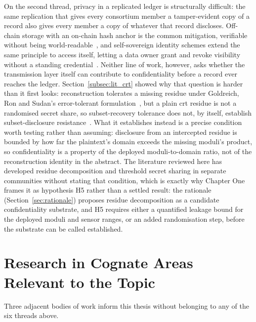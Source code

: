 \documentclass[12pt,a4paper,oneside]{book}
\begin{document}
On the second thread, privacy in a replicated ledger is structurally
difficult: the same replication that gives every consortium member a
tamper-evident copy of a record also gives every member a copy of whatever
that record discloses. Off-chain storage with an on-chain hash anchor is
the common mitigation, verifiable without being
world-readable~\cite{kim2023privacy}, and self-sovereign identity schemes
extend the same principle to access itself, letting a data owner grant and
revoke visibility without a standing
credential~\cite{amraouy2025ssi}. Neither line of work, however, asks
whether the transmission layer itself can contribute to confidentiality
before a record ever reaches the ledger. Section~\ref{subsec:lit_crt}
showed why that question is harder than it first looks: reconstruction
tolerates a missing residue under Goldreich, Ron and Sudan's
error-tolerant formulation~\cite{goldreich1999china}, but a plain
\gls{crt} residue is not a randomised secret share, so subset-recovery
tolerance does not, by itself, establish subset-disclosure
resistance~\cite{shoup2009computational}. What it establishes instead is
a precise condition worth testing rather than assuming: disclosure from
an intercepted residue is bounded by how far the plaintext's domain
exceeds the missing moduli's product, so confidentiality is a property of
the deployed moduli-to-domain ratio, not of the reconstruction identity
in the abstract. The literature reviewed here has developed residue
decomposition and threshold secret sharing in separate communities
without stating that condition, which is exactly why Chapter One frames
it as hypothesis H5 rather than a settled result: the rationale
(Section~\ref{sec:rationale}) proposes residue decomposition as a
candidate confidentiality substrate, and H5 requires either a quantified
leakage bound for the deployed moduli and sensor ranges, or an added
randomisation step, before the substrate can be called established.

\section{Research in Cognate Areas Relevant to the Topic}
\label{sec:lit_cognate}

Three adjacent bodies of work inform this thesis without belonging to any
of the six threads above.
\end{document}
